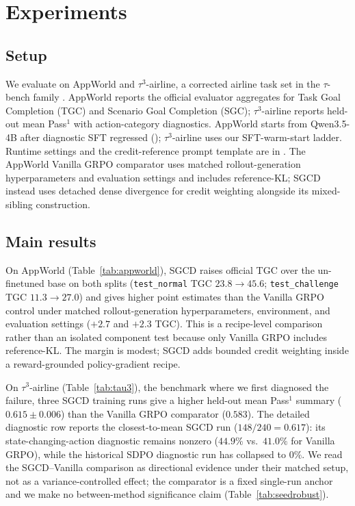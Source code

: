 \section{Experiments}
\label{sec:experiments}

\subsection{Setup}
We evaluate on AppWorld \citep{appworld2024} and $\tau^3$-airline, a corrected
airline task set in the $\tau$-bench family
\citep{taubench2024,tau2bench2025,tau3bench2026}. AppWorld reports the official
evaluator aggregates for Task Goal Completion (TGC) and Scenario Goal Completion
(SGC); $\tau^3$-airline reports
held-out mean Pass$^1$ with action-category diagnostics. AppWorld starts
from Qwen3.5-4B after diagnostic SFT regressed ();
$\tau^3$-airline uses our SFT-warm-start ladder. Runtime settings and the
credit-reference prompt template are in . The AppWorld
Vanilla GRPO comparator uses matched rollout-generation hyperparameters and
evaluation settings and includes reference-KL; SGCD instead uses detached dense
divergence for credit weighting alongside its mixed-sibling construction.



\subsection{Main results}
On AppWorld (Table~\ref{tab:appworld}), SGCD raises official TGC over the
un-finetuned base on both splits (\texttt{test\_normal} TGC $23.8\to45.6$;
\texttt{test\_challenge} TGC $11.3\to27.0$) and gives higher point estimates than
the Vanilla GRPO control under matched rollout-generation hyperparameters,
environment, and evaluation settings ($+2.7$ and $+2.3$ TGC). This is a
recipe-level comparison rather than
an isolated component test because only Vanilla GRPO includes reference-KL.
The margin is modest; SGCD adds bounded credit weighting
inside a reward-grounded policy-gradient recipe.

On $\tau^3$-airline (Table~\ref{tab:tau3}), the benchmark where we first
diagnosed the failure, three SGCD training runs give a higher held-out mean Pass$^1$
summary ($0.615\pm0.006$) than the Vanilla GRPO comparator ($0.583$).
The detailed diagnostic row reports the closest-to-mean SGCD run
($148/240=0.617$): its state-changing-action diagnostic remains nonzero ($44.9\%$
vs.\ $41.0\%$ for Vanilla GRPO), while the historical SDPO diagnostic run has
collapsed to $0\%$. We read the SGCD--Vanilla comparison as directional evidence
under their matched setup, not as a variance-controlled effect; the comparator
is a fixed single-run anchor and we
make no between-method significance claim (Table~\ref{tab:seedrobust}).

